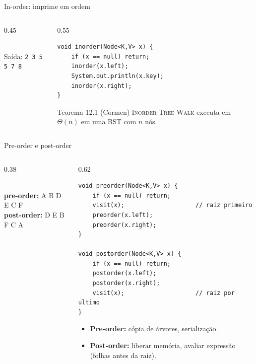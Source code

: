 \documentclass[aspectratio=169]{beamer}
\begin{document}
\begin{frame}[fragile]{In-order: imprime em ordem}
\begin{columns}[T]
\begin{column}{0.45\textwidth}
\centering
{}\\[4pt]
\small Saída: \texttt{2 3 5 5 7 8}
\end{column}
\begin{column}{0.55\textwidth}
\begin{lstlisting}
void inorder(Node<K,V> x) {
    if (x == null) return;
    inorder(x.left);
    System.out.println(x.key);
    inorder(x.right);
}
\end{lstlisting}
\begin{block}{Teorema 12.1 (Cormen)}
\textsc{Inorder-Tree-Walk} executa em $\Theta(n)$ em uma BST com $n$ nós.
\end{block}
\end{column}
\end{columns}
\end{frame}

\begin{frame}[fragile,shrink=5]{Pre-order e post-order}
\begin{columns}[T]
\begin{column}{0.38\textwidth}
\centering
{}\\[4pt]
\small
\textbf{pre-order:} A B D E C F\\
\textbf{post-order:} D E B F C A
\end{column}
\begin{column}{0.62\textwidth}
\begin{lstlisting}
void preorder(Node<K,V> x) {
    if (x == null) return;
    visit(x);                    // raiz primeiro
    preorder(x.left);
    preorder(x.right);
}

void postorder(Node<K,V> x) {
    if (x == null) return;
    postorder(x.left);
    postorder(x.right);
    visit(x);                    // raiz por ultimo
}
\end{lstlisting}
\begin{itemize}\scriptsize
  \item \textbf{Pre-order:} cópia de árvores, serialização.
  \item \textbf{Post-order:} liberar memória, avaliar expressão (folhas antes da raiz).
\end{itemize}
\end{column}
\end{columns}
\end{frame}
\end{document}
